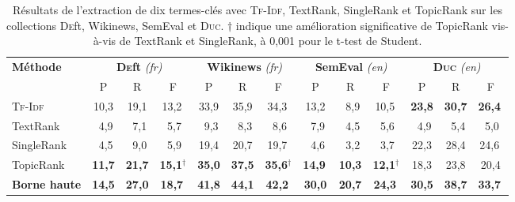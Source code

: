         \begin{table}
          \centering
          \begin{tabular}{l|c@{~~}c@{~~}c@{~}|c@{~~}c@{~~}c@{~}|c@{~~}c@{~~}c@{~}|c@{~~}c@{~~}c@{~}}
            \toprule
            \multirow{2}{*}[-2pt]{\textbf{Méthode}} & \multicolumn{3}{c|}{\textbf{\textsc{De}ft} \textit{(fr)}} & \multicolumn{3}{c|}{\textbf{Wikinews} \textit{(fr)}} & \multicolumn{3}{c|}{\textbf{SemEval} \textit{(en)}} & \multicolumn{3}{c}{\textbf{\textsc{Duc}} \textit{(en)}}\\
            \cline{2-4}\cline{5-7}\cline{8-10}\cline{11-13}
            & P & R & F & P & R & F & P & R & F & P & R & F\\
            \hline
            \textsc{Tf-Idf} & 10,3 & 19,1 & 13,2$^{~}$ & 33,9 & 35,9 & 34,3$^{~}$ & 13,2 & $~~$8,9 & 10,5$^{~}$ & \textbf{23,8} & \textbf{30,7} & \textbf{26,4}$^{~}$\\
            TextRank & $~~$4,9 & $~~$7,1 & $~~$5,7$^{~}$ & $~~$9,3 & $~~$8,3 & $~~$8,6$^{~}$ & $~~$7,9 & $~~$4,5 & $~~$5,6$^{~}$ & $~~$4,9 & $~~$5,4 & $~~$5,0$^{~}$\\
            SingleRank & $~~$4,5 & $~~$9,0 & $~~$5,9$^{~}$ & 19,4 & 20,7 & 19,7$^{~}$ & $~~$4,6 & $~~$3,2 & $~~$3,7$^{~}$ & 22,3 & 28,4 & 24,6$^{~}$\\
            TopicRank & \textbf{11,7} & \textbf{21,7} & \textbf{15,1}$^\dagger$ & \textbf{35,0} & \textbf{37,5} & \textbf{35,6}$^\dagger$ & \textbf{14,9}$^{~}$ & \textbf{10,3} & \textbf{12,1}$^\dagger$ & 18,3 & 23,8 & 20,4\\
            \hline
            \textbf{Borne haute} & \textbf{14,5} & \textbf{27,0} & \textbf{18,7}$^{~}$ & \textbf{41,8} & \textbf{44,1} & \textbf{42,2}$^{~}$ & \textbf{30,0} & \textbf{20,7} & \textbf{24,3}$^{~}$ & \textbf{30,5} & \textbf{38,7} & \textbf{33,7}$^{~}$\\
            \bottomrule
          \end{tabular}
          \caption[Résultats de l'extraction de dix termes-clés avec \textsc{Tf-Idf},
                   TextRank, SingleRank et TopicRank sur les collections
                   \textsc{De}ft, Wikinews, SemEval et \textsc{Duc}]{
            Résultats de l'extraction de dix termes-clés avec \textsc{Tf-Idf}, TextRank,
            SingleRank et TopicRank sur les collections \textsc{De}ft, Wikinews,
            SemEval et \textsc{Duc}. $\dagger$ indique une amélioration
            significative de TopicRank vis-à-vis de TextRank et SingleRank, à
            0,001 pour le t-test de Student.
            \label{tab:resultats_globaux}
          }
        \end{table}

